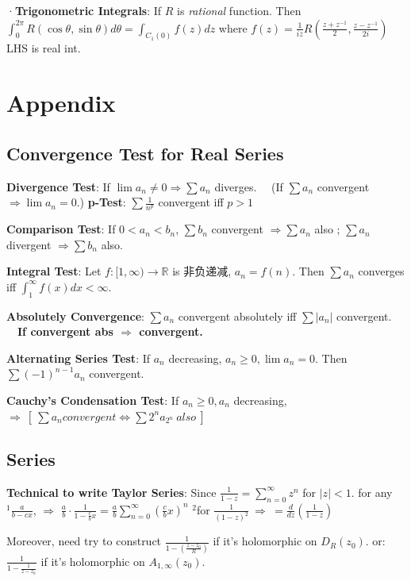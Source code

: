 \documentclass[9pt]{article}
\begin{document}
·\textbf{Trigonometric Integrals}: {\small If $R$ is \textit{rational} function. Then $\int_0^{2\pi}R(\cos\theta,\sin\theta)d\theta = \int_{C_1(0)}f(z)dz$ \quad where $f(z)=\frac{1}{iz}R\left(\frac{z+z^{-1}}{2},\frac{z-z^{-1}}{2i}\right)$} {\tiny LHS is real int.}


\section{Appendix}

\subsection{Convergence Test for Real Series} %

\textbf{Divergence Test}: If $\lim a_n\ne 0 \Rightarrow \sum a_n$ diverges. \ \ (If $\sum a_n$ convergent $\Rightarrow \lim a_n=0.$) \qquad \textbf{p-Test}: $\sum \frac{1}{n^p}$ convergent iff $p>1$

\textbf{Comparison Test}: If $0<a_n<b_n$, $\sum b_n$ convergent $\Rightarrow \sum a_n$ also ; $\sum a_n$ divergent $\Rightarrow \sum b_n$ also.

\textbf{Integral Test}: Let $f:[1,\infty)\rightarrow\mathbb{R}$ is 非负递减, $a_n=f(n)$. Then $\sum a_n$ converges iff $\int_{1}^{\infty}f(x)dx<\infty.$

\textbf{Absolutely Convergence}: $\sum a_n$ convergent absolutely iff $\sum |a_n|$ convergent. \ \ \textbf{If convergent abs $\Rightarrow$ convergent.}

\textbf{Alternating Series Test}: If $a_n$ decreasing, $a_n\geq 0,\lim a_n = 0$. Then $\sum (-1)^{n-1}a_n$ convergent.

\textbf{Cauchy's Condensation Test}: If $a_n\geq 0,a_n$ decreasing, $\Rightarrow \ [\ \sum a_n convergent \Leftrightarrow \sum 2^na_{2^n} \ also \ ]$


\subsection{Series}

\textbf{Technical to write Taylor Series}: {\scriptsize Since $\frac{1}{1-z}=\sum_{n=0}^{\infty}z^n$ for $|z|<1$. \quad for any $^1\frac{a}{b-cx}$, $\Rightarrow$ $\frac{a}{b}\cdot\frac{1}{1-\frac{c}{b}x}=\frac{a}{b}\sum_{n=0}^{\infty}\left(\frac{c}{b}x\right)^n$ \quad $^2$for $\frac{1}{(1-z)^2} \ \Rightarrow \ =\frac{d}{dz}\left(\frac{1}{1-z}\right)$}

{\scriptsize \qquad Moreover, need try to construct $\frac{1}{1-(\frac{z-z_0}{R})}$ if it's holomorphic on $D_{R}(z_0)$. \qquad or: $\frac{1}{1-\frac{1}{z-z_0}}$ if it's holomorphic on $A_{1,\infty}(z_0)$.}
\end{document}
